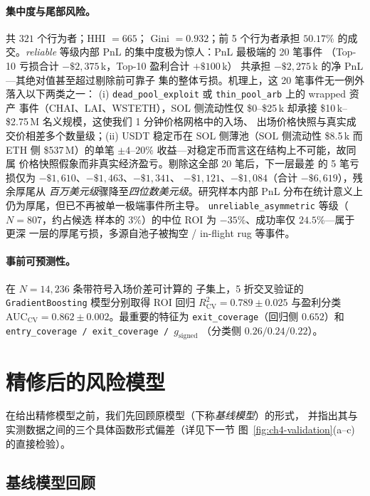 \documentclass[sigconf,nonacm,10pt]{acmart}
\newcommand{\gsigned}{g_{\text{signed}}}
\begin{document}
\paragraph{集中度与尾部风险。} 共 $321$ 个行为者；HHI $=665$；
Gini $=0.932$；前 5 个行为者承担 $50.17\%$ 的成交。\emph{reliable}
等级内部 PnL 的集中度极为惊人：PnL 最极端的 20 笔事件
（Top-10 亏损合计 $-\$2{,}375$\,k，Top-10 盈利合计 $+\$100$\,k）
共承担 $-\$2{,}275$\,k 的净 PnL---其绝对值甚至超过剔除前可靠子
集的整体亏损。机理上，这 20 笔事件无一例外落入以下两类之一：
(i) \texttt{dead\allowbreak\_pool\allowbreak\_exploit} 或
\texttt{thin\allowbreak\_pool\allowbreak\_arb} 上的 wrapped 资产
事件（CHAI、LAI、WSTETH），SOL 侧流动性仅 \$0--\$25\,k 却承接
\$10\,k--\$2.75\,M 名义规模，这使我们 1 分钟价格网格中的入场、
出场价格快照与真实成交价相差多个数量级；(ii) USDT 稳定币在
SOL 侧薄池（SOL 侧流动性 \$8.5\,k 而 ETH 侧 \$537\,M）的单笔
$\pm\!4$--$20\%$ 收益---对稳定币而言这在结构上不可能，故同属
价格快照假象而非真实经济盈亏。剔除这全部 20 笔后，下一层最差
的 5 笔亏损仅为 $-\$1{,}610$、$-\$1{,}463$、$-\$1{,}341$、
$-\$1{,}121$、$-\$1{,}084$（合计 $-\$6{,}619$），残余厚尾从
\emph{百万美元级}骤降至\emph{四位数美元级}。研究样本内部 PnL
分布在统计意义上仍为厚尾，但已不再被单一极端事件所主导。
\texttt{unreliable\allowbreak\_asymmetric} 等级（$N=807$，约占候选
样本的 $3\%$）的中位 ROI 为 $-35\%$、成功率仅 $24.5\%$---属于更深
一层的厚尾亏损，多源自池子被掏空 / in-flight rug 等事件。

\paragraph{事前可预测性。} 在 $N=14{,}236$ 条带符号入场价差可计算的
子集上，5 折交叉验证的 \texttt{GradientBoosting} 模型分别取得
ROI 回归 $R^{2}_{\text{CV}} = 0.789 \pm 0.025$ 与盈利分类
AUC$_{\text{CV}} = 0.862 \pm 0.002$。最重要的特征为
\texttt{exit\_coverage}（回归侧 $0.652$）和
\texttt{entry\_coverage / exit\_coverage / $\gsigned$}
（分类侧 $0.26 / 0.24 / 0.22$）。

\section{精修后的风险模型}
\label{sec:ch4-refined-model}

在给出精修模型之前，我们先回顾原模型（下称\textit{基线模型}）的形式，
并指出其与实测数据之间的三个具体函数形式偏差（详见下一节
图~\ref{fig:ch4-validation}(a--c) 的直接检验）。

\subsection{基线模型回顾}
\end{document}
